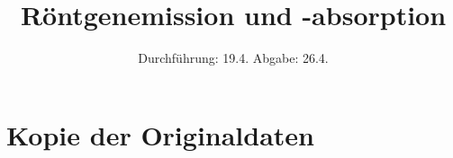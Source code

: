 

\subject{VERSUCH NUMMER}
\title{Röntgenemission und -absorption}
\date{
  Durchführung: 19.4.
  \hspace{3em}
  Abgabe: 26.4.
}



\maketitle
\thispagestyle{empty}
\tableofcontents
\newpage






\printbibliography

\appendix
\section{Kopie der Originaldaten}


